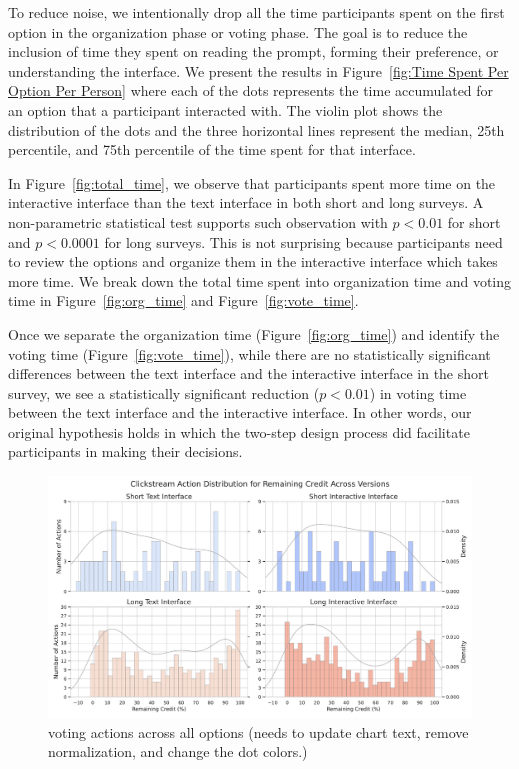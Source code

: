 To reduce noise, we intentionally drop all the time participants spent on the first option in the organization phase or voting phase. The goal is to reduce the inclusion of time they spent on reading the prompt, forming their preference, or understanding the interface. We present the results in Figure~\ref{fig:Time Spent Per Option Per Person} where each of the dots represents the time accumulated for an option that a participant interacted with. The violin plot shows the distribution of the dots and the three horizontal lines represent the median, 25th percentile, and 75th percentile of the time spent for that interface.

In Figure~\ref{fig:total_time}, we observe that participants spent more time on the interactive interface than the text interface in both short and long surveys. A non-parametric statistical test supports such observation with $p<0.01$ for short and $p<0.0001$ for long surveys. This is not surprising because participants need to review the options and organize them in the interactive interface which takes more time. We break down the total time spent into organization time and voting time in Figure~\ref{fig:org_time} and Figure~\ref{fig:vote_time}.

Once we separate the organization time (Figure~\ref{fig:org_time}) and identify the voting time (Figure~\ref{fig:vote_time}), while there are no statistically significant differences between the text interface and the interactive interface in the short survey, we see a statistically significant reduction ($p<0.01$) in voting time between the text interface and the interactive interface. In other words, our original hypothesis holds in which the two-step design process did facilitate participants in making their decisions.

\begin{figure}[ht]
    \centering
    \includegraphics[width=\textwidth]{content/image/results/clickstream_action_distribution.pdf}
    \caption{voting actions across all options (needs to update chart text, remove normalization, and change the dot colors.)}
    \label{fig:voting_all}
\end{figure}

